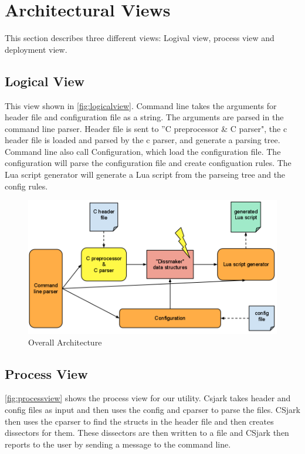 \section{Architectural Views}
This section describes three different views: Logival view, process view and deployment view.

\subsection{Logical View}
This view shown in \autoref{fig:logicalview}. Command line takes the arguments for header file and configuration file as a string. The arguments are parsed in the command line parser. Header file is sent to ''C preprocessor \& C parser", the c header file is loaded and parsed by the c parser, and generate a parsing tree. Command line also call Configuration, which load the configuration file. The configuration will parse the configuration file and create configuation rules. The Lua script generator will generate a Lua script from the parseing tree and the config rules.

\begin{figure}[htb]
	\includegraphics[width=\textwidth]{./planning/img/overall_design}
	\caption{Overall Architecture\label{fig:logicalview}}
\end{figure}


\subsection{Process View}
\autoref{fig:processview} shows the process view for our utility. Csjark takes header and config files as input and then uses the config and cparser to parse the files. CSjark then uses the cparser to find the structs in the header file and then creates dissectors for them. These dissectors are then written to a file and CSjark then reports to the user by sending a message to the command line.

